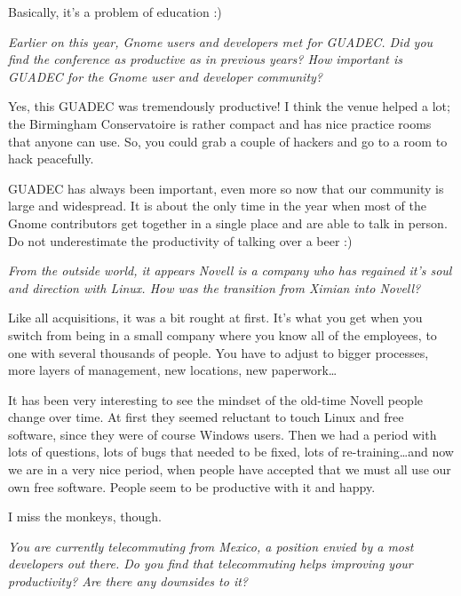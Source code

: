 \documentclass{book}
\begin{document}
Basically, it's a problem of education :)

\bigskip

\emph{Earlier on this year, Gnome users and developers met for
GUADEC. Did you find the conference as productive as in previous
years? How important is GUADEC for the Gnome user and developer
community?}

\bigskip

Yes, this GUADEC was tremendously productive! I think the venue helped
a lot; the Birmingham Conservatoire is rather compact and has nice
practice rooms that anyone can use. So, you could grab a couple of
hackers and go to a room to hack peacefully.

GUADEC has always been important, even more so now that our community
is large and widespread. It is about the only time in the year when
most of the Gnome contributors get together in a single place and are
able to talk in person. Do not underestimate the productivity of
talking over a beer :)

\bigskip

\emph{From the outside world, it appears Novell is a company who has
regained it's soul and direction with Linux. How was the transition
from Ximian into Novell?}

\bigskip

Like all acquisitions, it was a bit rought at first. It's what you get
when you switch from being in a small company where you know all of
the employees, to one with several thousands of people. You have to
adjust to bigger processes, more layers of management, new locations,
new paperwork\ldots

It has been very interesting to see the mindset of the old-time Novell
people change over time. At first they seemed reluctant to touch Linux
and free software, since they were of course Windows users. Then we
had a period with lots of questions, lots of bugs that needed to be
fixed, lots of re-training\ldots and now we are in a very nice period,
when people have accepted that we must all use our own free
software. People seem to be productive with it and happy.

I miss the monkeys, though.

\bigskip

\emph{You are currently telecommuting from Mexico, a position envied by a
most developers out there. Do you find that telecommuting helps
improving your productivity? Are there any downsides to it?}

\bigskip
\end{document}
